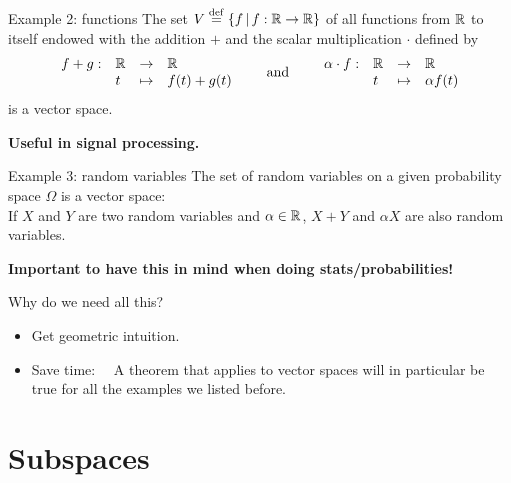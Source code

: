 \documentclass{beamer}
\begin{document}
\begin{frame}[t]{Example 2: functions}
	The set \quad $V \overset{\rm def}{=} \{ f \, | \, f: \mathbb{R} \to \mathbb{R} \}$ \quad of all functions from $\mathbb{R}$ to itself endowed with the addition $+$ and the scalar multiplication $\cdot$ defined by
	$$
	\begin{array}{rlll}
		f+g :& \mathbb{R} & \to & \mathbb{R} \\
			 &t & \mapsto & f(t) + g(t)
	\end{array}
	\qquad
	\text{and}
	\qquad
	\begin{array}{rlll}
		\alpha \cdot f :& \mathbb{R} & \to & \mathbb{R} \\
						&t & \mapsto & \alpha f(t)
	\end{array}
	$$
	is a vector space.
	\vspace{3cm}
	\begin{center}
		\textbf{Useful in signal processing.}
	\end{center}
\end{frame}

\begin{frame}{Example 3: random variables}
	The set of random variables on a given probability space $\Omega$ is a vector space: 
	\\
	If $X$ and $Y$ are two random variables and $\alpha \in \mathbb{R}$, $X+Y$ and $\alpha X$ are also random variables.

	\vspace{0.8cm}
	\begin{center}
		\textbf{Important to have this in mind when doing stats/probabilities!}
	\end{center}
\end{frame}

\begin{frame}{Why do we need all this?}
	\begin{itemize}
		\item Get geometric intuition. 
			\vspace{1.1cm}
		\item Save time: \ \ 
			A theorem that applies to vector spaces will in particular be true for all the examples we listed before.
	\end{itemize}
\end{frame}

\section{Subspaces}
\end{document}

